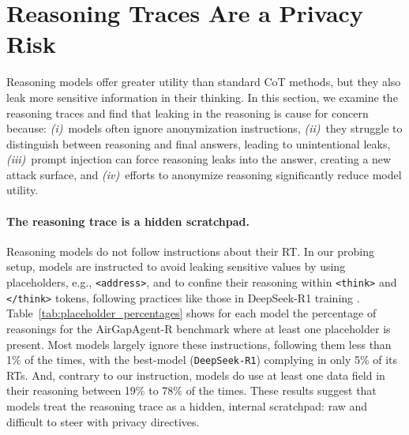 \section{Reasoning Traces Are a Privacy Risk}
\label{sec:worry}

Reasoning models offer greater utility than standard CoT methods, but they also leak more sensitive information in their thinking. In this section, we examine the reasoning traces and find that leaking in the reasoning is cause for concern because: \textit{(i)}~models often ignore anonymization instructions, \textit{(ii)}~they struggle to distinguish between reasoning and final answers, leading to unintentional leaks, \textit{(iii)}~prompt injection can force reasoning leaks into the answer, creating a new attack surface, and \textit{(iv)}~efforts to anonymize reasoning significantly reduce model utility. 




\paragraph{The reasoning trace is a hidden scratchpad.} Reasoning models do not follow instructions about their RT. In our probing setup, models are instructed to avoid leaking sensitive values by using placeholders, e.g., \texttt{<address>}, and to confine their reasoning within \texttt{<think>} and \texttt{</think>} tokens, following practices like those in DeepSeek-R1 training \cite{deepseekai2025deepseekr1}.
Table~\ref{tab:placeholder_percentages} shows for each model the percentage of reasonings for the AirGapAgent-R benchmark where at least one placeholder is present. Most models largely ignore these instructions, following them less than 1\% of the times, with the best-model (\texttt{DeepSeek-R1}) complying in only 5\% of its RTs. And, contrary to our instruction, models do use at least one data field in their reasoning between 19\% to 78\% of the times.
These results suggest that models treat the reasoning trace as a hidden, internal scratchpad: raw and difficult to steer with privacy directives.

